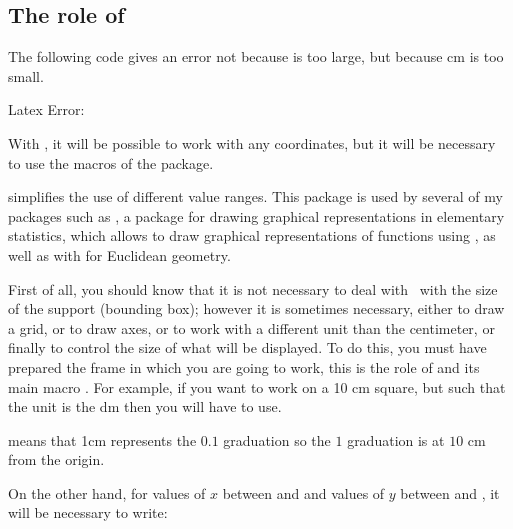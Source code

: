 \subsection{The role of \tkzname{\tkznameofpack}}

The following code gives an error not because  is too large,
but because  cm is too small.

 {\color{red} Latex Error:}

\begin{tkzltxexample}[right margin=7cm,small]
\end{tkzltxexample}

With , it will be possible to work with any coordinates, but
it will be necessary to use the macros of the package.

 simplifies the use of different value ranges. This
package is used by several of my packages such as , a package
for drawing graphical representations in elementary statistics,
 which allows to draw graphical representations of
functions using , as well as with  for
Euclidean geometry.

First of all, you should know that it is not necessary to deal with \TIKZ\ with
the size of the support (bounding box); however it is sometimes necessary,
either to draw a grid, or to draw axes, or to work with a different unit than
the centimeter, or finally to control the size of what will be displayed.
 To do this, you must have prepared the frame in which you are going to work,
this is the role of  and its main macro
. For example, if you want to work on a 10 cm square, but
such that the unit is the dm then you will have to use.

\begin{tkzltxexample}[right margin=7cm,small]
\tkzInit[xmax=1,ymax=1,xstep=0.1,ystep=0.1]
\end{tkzltxexample}

 means that 1cm represents the $0.1$ graduation so the $1$
graduation is at $10$ cm from the origin.

On the other hand, for values of $x$ between  and 
and values of $y$ between  and , it will be
necessary to write:

